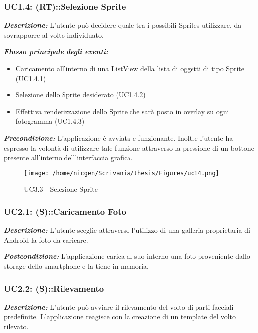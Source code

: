 \subsubsection{UC1.4: (RT)::Selezione Sprite}

\textbf{\textit{Descrizione:}} L'utente può decidere quale tra i possibili Sprites utilizzare, da sovrapporre al volto individuato.

\textbf{\textit{Flusso principale degli eventi:}} 

\begin{itemize}
\item Caricamento all'interno di una ListView della lista di oggetti di tipo Sprite (UC1.4.1)
\item Selezione dello Sprite desiderato (UC1.4.2)
\item Effettiva renderizzazione dello Sprite che sarà posto in overlay su ogni fotogramma (UC1.4.3)
\end{itemize}

\textbf{\textit{Precondizione:}} L'applicazione è avviata e funzionante. Inoltre l'utente ha espresso la volontà di utilizzare tale funzione attraverso la pressione di un bottone presente all'interno dell'interfaccia grafica.

\begin{figure}[H]\centering  
\texttt{[image: /home/nicgen/Scrivania/thesis/Figures/uc14.png]}
\caption[UC1.4 - Selezione Sprite]{UC3.3 - Selezione Sprite}
\label{pic-a}
\end{figure}

\subsubsection{UC2.1: (S)::Caricamento Foto}

\textbf{\textit{Descrizione:}} L'utente sceglie attraverso l'utilizzo di una galleria proprietaria di Android la foto da caricare.

\textbf{\textit{Postcondizione:}} L'applicazione carica al suo interno una foto proveniente dallo storage dello smartphone e la tiene in memoria.


\subsubsection{UC2.2: (S)::Rilevamento}

\textbf{\textit{Descrizione:}} L'utente può avviare il rilevamento del volto di parti facciali predefinite. L'applicazione reagisce con la creazione di un template del volto rilevato.


